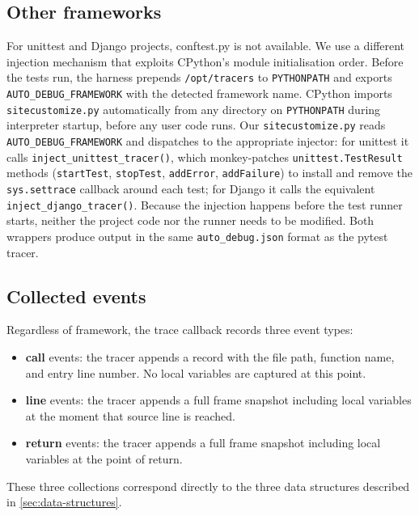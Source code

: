\subsection{Other frameworks}

For unittest and Django projects, conftest.py is not available. We use a different injection mechanism that exploits CPython's module initialisation order. Before the tests run, the harness prepends \texttt{/opt/tracers} to \texttt{PYTHONPATH} and exports \texttt{AUTO\_DEBUG\_FRAMEWORK} with the detected framework name. CPython imports \texttt{sitecustomize.py} automatically from any directory on \texttt{PYTHONPATH} during interpreter startup, before any user code runs. Our \texttt{sitecustomize.py} reads \texttt{AUTO\_DEBUG\_FRAMEWORK} and dispatches to the appropriate injector: for unittest it calls \texttt{inject\_unittest\_tracer()}, which monkey-patches \texttt{unittest.TestResult} methods (\texttt{startTest}, \texttt{stopTest}, \texttt{addError}, \texttt{addFailure}) to install and remove the \texttt{sys.settrace} callback around each test; for Django it calls the equivalent \texttt{inject\_django\_tracer()}. Because the injection happens before the test runner starts, neither the project code nor the runner needs to be modified. Both wrappers produce output in the same \texttt{auto\_debug.json} format as the pytest tracer.

\subsection{Collected events}

Regardless of framework, the trace callback records three event types:

\begin{itemize}
    \item \textbf{call} events: the tracer appends a record with the file path, function name, and entry line number. No local variables are captured at this point.
    \item \textbf{line} events: the tracer appends a full frame snapshot including local variables at the moment that source line is reached.
    \item \textbf{return} events: the tracer appends a full frame snapshot including local variables at the point of return.
\end{itemize}

These three collections correspond directly to the three data structures described in \cref{sec:data-structures}.


